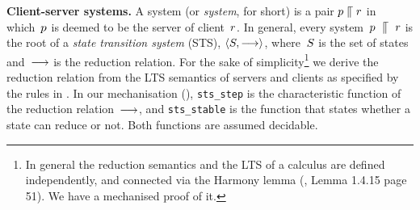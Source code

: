 {\bfseries Client-server systems.} %
%
%
%
%
A {\em \svrclt} system (or {\em system}, for short) is a pair
$p \mathrel{\llceil} r$ in which~$p$ is deemed to be the server of
client~$r$.
%
%
In general, every system~$p~ \mathrel{\llceil} ~r$ is the root of a
{\em state transition system} (STS), $\langle  S ,  \mathrel{\overset{ }\longrightarrow} \rangle $,
where~$S$ is the set of states and~$\mathrel{\overset{}\longrightarrow}$ is the reduction
relation.  For the sake of simplicity\footnote{In general the
  reduction semantics and the LTS of a calculus are defined
  independently, and connected via the Harmony lemma
  (\cite{sangiorgi}, Lemma 1.4.15 page 51).  %
  We have a mechanised proof of it.}%
  we derive the reduction relation from the LTS
semantics of servers and clients as specified by the rules in
.
In our mechanisation (), \lstinline!sts_step! is the
characteristic function of the reduction relation~$\mathrel{\overset{}\longrightarrow}$, and
\lstinline!sts_stable! is the function that states whether a state can
reduce or not. Both functions are assumed decidable.
%

